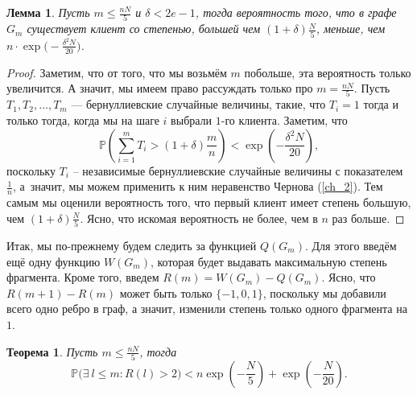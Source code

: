 \documentclass{matmex-diploma-custom}
\newcommand{\PRob}{\mathbb P}
\newcommand{\leqs}{\leqslant}
\newtheorem{theorem}{Теорема}
\newtheorem{lemma}{Лемма}
\theoremstyle{named}
\begin{document}
\begin{lemma}\label{l4}
Пусть $m \leqs \frac{nN}{5}$ и $\delta < 2e - 1$, тогда вероятность того, что в графе $G_m$ существует клиент 
со степенью, большей чем $(1+\delta)\frac{N}{5}$, меньше, чем $n \cdot \exp\big(- \frac{\delta^2 N}{20}\big)$.
\end{lemma}
\begin{proof}
Заметим, что от того, что мы возьмём $m$ побольше, эта вероятность только увеличится. 
А значит, мы имеем право рассуждать только про $m = \frac{nN}{5}$. 
Пусть $T_1, T_2, \dots, T_m$ --- бернуллиевские случайные величины, такие, что $T_i = 1$ тогда и только тогда, 
когда мы на шаге $i$ выбрали $1$-го клиента.
Заметим, что 
\begin{equation}
\PRob\left(\sum_{i = 1}^m T_i > (1+\delta)\frac{m}{n} \right) < \exp\left(- \frac{\delta^2 N}{20} \right),
\end{equation}
поскольку $T_i$ -- независимые бернуллиевские случайные величины с показателем $\frac{1}{n}$, 
а~значит, мы можем применить к ним неравенство Чернова (\ref{ch_2}).
Тем самым мы оценили вероятность того, что первый клиент имеет степень большую, чем $(1+\delta)\frac{N}{5}$.
Ясно, что искомая вероятность не более, чем в $n$ раз больше.
\end{proof}

Итак, мы по-прежнему будем следить за функцией $Q(G_m)$. Для этого введём ещё одну функцию $W(G_m)$, 
которая будет выдавать максимальную степень фрагмента.
Кроме того, введем $R(m) = W(G_m) - Q(G_m)$. 
Ясно, что $R(m+1) - R(m)$ может быть только $\{-1,0,1\}$, поскольку мы добавили всего одно ребро в граф, 
а значит, изменили степень только одного фрагмента на $1$. 

\begin{theorem}\label{t4}
Пусть $m \leqs \frac{nN}{5}$, тогда
\begin{equation}
\PRob\Big(\exists~l \leqs m : R(l) > 2 \Big) < n\exp\left(-\frac{N}{5}\right) +  \exp\left(- \frac{N}{20}\right).
\end{equation}
\end{theorem}
\end{document}
